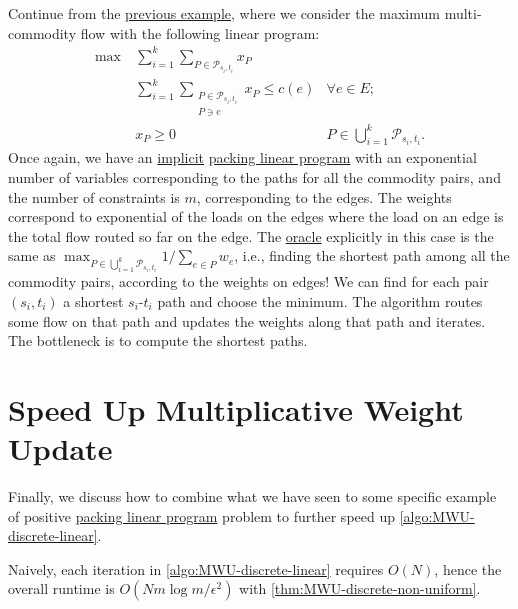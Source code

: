 \begin{eg}
	Continue from the \hyperref[eg:maximum-multi-commodity-flow-MWU]{previous example}, where we consider the maximum multi-commodity flow with the following linear program:
	\[
		\begin{aligned}
			\max~ & \sum_{i=1}^{k} \sum_{P \in \mathcal{P} _{s_i, t_i}} x_P                                                         \\
			      & \sum_{i=1}^{k} \sum_{\substack{P \in\mathcal{P} _{s_i, t_i}                                                     \\ P \ni e}} x_P \leq c(e) & \forall e \in E ;                                  \\
			      & x_P \geq 0                                                  & P \in \bigcup_{i=1}^{k} \mathcal{P} _{s_i, t_i} .
		\end{aligned}
	\]
	Once again, we have an \hyperref[def:implicit-LP]{implicit} \hyperref[def:packing-LP]{packing linear program} with an exponential number of variables corresponding to the paths for all the commodity pairs, and the number of constraints is \(m\), corresponding to the edges. The weights correspond to exponential of the loads on the edges where the load on an edge is the total flow routed so far on the edge. The \hyperref[eq:MWU-oracle-LP]{oracle} explicitly in this case is the same as \(\max _{P \in \bigcup_{i=1}^{k} \mathcal{P} _{s_i, t_i}} 1 / \sum_{e \in P} w_e\), i.e., finding the shortest path among all the commodity pairs, according to the weights on edges! We can find for each pair \((s_i, t_i)\) a shortest \(s_i\)-\(t_i\) path and choose the minimum. The algorithm routes some flow on that path and updates the weights along that path and iterates. The bottleneck is to compute the shortest paths.
\end{eg}

\section{Speed Up Multiplicative Weight Update}
Finally, we discuss how to combine what we have seen to some specific example of positive \hyperref[def:packing-LP]{packing linear program} problem to further speed up \autoref{algo:MWU-discrete-linear}.

\begin{prev}
	Naively, each iteration in \autoref{algo:MWU-discrete-linear} requires \(O(N)\), hence the overall runtime is \(O(N m \log m / \epsilon ^2)\) with \autoref{thm:MWU-discrete-non-uniform}.
\end{prev}

